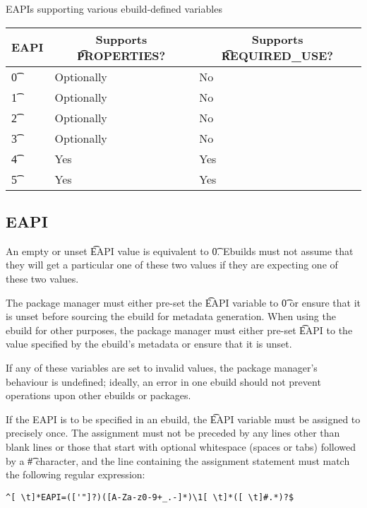 \begin{centertable}{EAPIs supporting various ebuild-defined variables}
\label{tab:optional-vars-table}
    \begin{tabular}{ l l l }
        \toprule
        \multicolumn{1}{c}{\textbf{EAPI}} &
        \multicolumn{1}{c}{\textbf{Supports \t{PROPERTIES}?}} &
        \multicolumn{1}{c}{\textbf{Supports \t{REQUIRED\_USE}?}} \\
        \midrule
    \t{0} & Optionally & No \\
    \t{1} & Optionally & No \\
    \t{2} & Optionally & No \\
    \t{3} & Optionally & No \\
    \t{4} & Yes & Yes \\
    \t{5} & Yes & Yes \\
    \bottomrule
    \end{tabular}
\end{centertable}

\subsection{EAPI}
\label{sec:pre-source-eapi}

An empty or unset \t{EAPI} value is equivalent to \t{0}. Ebuilds must not assume that they will get
a particular one of these two values if they are expecting one of these two values.

The package manager must either pre-set the \t{EAPI} variable to \t{0} or ensure that it is unset
before sourcing the ebuild for metadata generation. When using the ebuild for other purposes, the
package manager must either pre-set \t{EAPI} to the value specified by the ebuild's metadata or
ensure that it is unset.

If any of these variables are set to invalid values, the package manager's behaviour is undefined;
ideally, an error in one ebuild should not prevent operations upon other ebuilds or packages.

If the EAPI is to be specified in an ebuild, the \t{EAPI} variable must be assigned to precisely
once. The assignment must not be preceded by any lines other than blank lines or those that start
with optional whitespace (spaces or tabs) followed by a \t{\#} character, and the line containing
the assignment statement must match the following regular expression:
\begin{verbatim}
^[ \t]*EAPI=(['"]?)([A-Za-z0-9+_.-]*)\1[ \t]*([ \t]#.*)?$
\end{verbatim}


